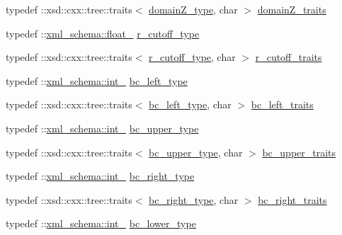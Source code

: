 \begin{DoxyCompactItemize}
\item 
typedef \+::xsd\+::cxx\+::tree\+::traits$<$ \hyperlink{classsetting__t_a2257367cc1475e2a9b1b2a82dbdaddaf}{domain\+Z\+\_\+type}, char $>$ \hyperlink{classsetting__t_a9247da64df3be9ea926998c19eb16349}{domain\+Z\+\_\+traits}
\item 
typedef \+::\hyperlink{namespacexml__schema_ad7e04ab17bba0b3fdde43fb79ef6ed87}{xml\+\_\+schema\+::float\+\_\+} \hyperlink{classsetting__t_ac5da16857addda387f3269e0a1a0cafa}{r\+\_\+cutoff\+\_\+type}
\item 
typedef \+::xsd\+::cxx\+::tree\+::traits$<$ \hyperlink{classsetting__t_ac5da16857addda387f3269e0a1a0cafa}{r\+\_\+cutoff\+\_\+type}, char $>$ \hyperlink{classsetting__t_add5ef63c1e740878483b913818829da3}{r\+\_\+cutoff\+\_\+traits}
\item 
typedef \+::\hyperlink{namespacexml__schema_acfa24ac68e1a188e7f44c36f7a158bf4}{xml\+\_\+schema\+::int\+\_\+} \hyperlink{classsetting__t_a182532ef9d6146add054e0118af040f2}{bc\+\_\+left\+\_\+type}
\item 
typedef \+::xsd\+::cxx\+::tree\+::traits$<$ \hyperlink{classsetting__t_a182532ef9d6146add054e0118af040f2}{bc\+\_\+left\+\_\+type}, char $>$ \hyperlink{classsetting__t_a1618c9945b34bcf5522be0925ad0b6b7}{bc\+\_\+left\+\_\+traits}
\item 
typedef \+::\hyperlink{namespacexml__schema_acfa24ac68e1a188e7f44c36f7a158bf4}{xml\+\_\+schema\+::int\+\_\+} \hyperlink{classsetting__t_abf5df957f10853c7b6a54a0073cd61fa}{bc\+\_\+upper\+\_\+type}
\item 
typedef \+::xsd\+::cxx\+::tree\+::traits$<$ \hyperlink{classsetting__t_abf5df957f10853c7b6a54a0073cd61fa}{bc\+\_\+upper\+\_\+type}, char $>$ \hyperlink{classsetting__t_add475d3af08f63aab575ec9a5b2ef6b6}{bc\+\_\+upper\+\_\+traits}
\item 
typedef \+::\hyperlink{namespacexml__schema_acfa24ac68e1a188e7f44c36f7a158bf4}{xml\+\_\+schema\+::int\+\_\+} \hyperlink{classsetting__t_a958fcc958aca728509db3a1f3756a0c9}{bc\+\_\+right\+\_\+type}
\item 
typedef \+::xsd\+::cxx\+::tree\+::traits$<$ \hyperlink{classsetting__t_a958fcc958aca728509db3a1f3756a0c9}{bc\+\_\+right\+\_\+type}, char $>$ \hyperlink{classsetting__t_abe4962aa498bbe5c5289cc8ba26dbd8e}{bc\+\_\+right\+\_\+traits}
\item 
typedef \+::\hyperlink{namespacexml__schema_acfa24ac68e1a188e7f44c36f7a158bf4}{xml\+\_\+schema\+::int\+\_\+} \hyperlink{classsetting__t_a69864ad49075236ce00f2a73cdcbb13b}{bc\+\_\+lower\+\_\+type}
\item 

\end{DoxyCompactItemize}
